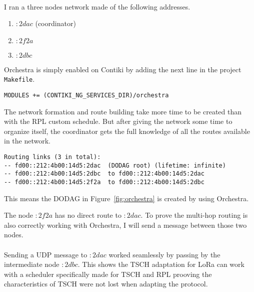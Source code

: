 \paragraph{}

I ran a three nodes network made of the following addresses.

\begin{enumerate}
  \item $:2dac$ (coordinator)
  \item $:2f2a$
  \item $:2dbc$
\end{enumerate}

Orchestra is simply enabled on Contiki by adding the next line in the project
\lstinline{Makefile}.

\begin{lstlisting}
MODULES += (CONTIKI_NG_SERVICES_DIR)/orchestra
\end{lstlisting}

The network formation and route building take more time to be created than with
the RPL custom schedule.
But after giving the network some time to organize itself, the coordinator gets
the full knowledge of all the routes available in the network.

\begin{lstlisting}
Routing links (3 in total):
-- fd00::212:4b00:14d5:2dac  (DODAG root) (lifetime: infinite)
-- fd00::212:4b00:14d5:2dbc  to fd00::212:4b00:14d5:2dac
-- fd00::212:4b00:14d5:2f2a  to fd00::212:4b00:14d5:2dbc
\end{lstlisting}

This means the DODAG in Figure~\ref{fig:orchestra} is created by using Orchestra.



The node $:2f2a$ has no direct route to $:2dac$.
To prove the multi-hop routing is also correctly working with Orchestra, I will
send a message between those two nodes.

\paragraph{}

Sending a UDP message to $:2dac$ worked seamlessly by passing by the
intermediate node $:2dbc$.
This shows the TSCH adaptation for LoRa can work with a scheduler specifically
made for TSCH and RPL prooving the characteristics of TSCH were not lost when
adapting the protocol.

